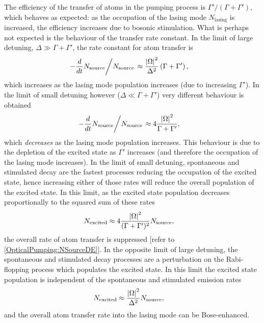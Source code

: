 The efficiency of the transfer of atoms in the pumping process is $\Gamma'/(\Gamma + \Gamma')$, which behaves as expected: as the occupation of the lasing mode $N_\text{lasing}$ is increased, the efficiency increases due to bosonic stimulation.  What is perhaps not expected is the behaviour of the transfer rate constant.  In the limit of large detuning, $\Delta \gg \Gamma + \Gamma'$, the rate constant for atom transfer is
\begin{align}
    \left.-\frac{d}{dt} N_\text{source}\middle/N_\text{source}\right. &\approx \frac{\abs{\Omega}^2}{\Delta^2} \left(\Gamma + \Gamma'\right), \label{OpticalPumping:SingleModePumpingRateLargeDetuning}
\end{align}
which increases as the lasing mode population increases (due to increasing $\Gamma'$).  In the limit of small detuning however ($\Delta \ll \Gamma + \Gamma'$) very different behaviour is obtained
\begin{align}
    \left.-\frac{d}{dt} N_\text{source}\middle/N_\text{source}\right. &\approx 4 \frac{\abs{\Omega}^2}{\Gamma + \Gamma'}, \label{OpticalPumping:SingleModePumpingRateZeroDetuning}
\end{align}
which \emph{decreases} as the lasing mode population increases.  This behaviour is due to the depletion of the excited state as $\Gamma'$ increases (and therefore the occupation of the lasing mode increases).  In the limit of small detuning, spontaneous and stimulated decay are the fastest processes reducing the occupation of the excited state, hence increasing either of those rates will reduce the overall population of the excited state.  In this limit, as the excited state population decreases proportionally to the squared sum of these rates
\begin{align}
    N_\text{excited} &\approx 4 \frac{\left|\Omega\right|^2}{(\Gamma + \Gamma')^2} N_\text{source},
\end{align}
the overall rate of atom transfer is suppressed [refer to \eqref{OpticalPumping:NSourceDE}].  In the opposite limit of large detuning, the spontaneous and stimulated decay processes are a perturbation on the Rabi-flopping process which populates the excited state.  In this limit the excited state population is independent of the spontaneous and stimulated emission rates
\begin{align}
    N_\text{excited} &\approx \frac{\left|\Omega\right|^2}{\Delta^2} N_\text{source},
\end{align}
and the overall atom transfer rate into the lasing mode can be Bose-enhanced.

